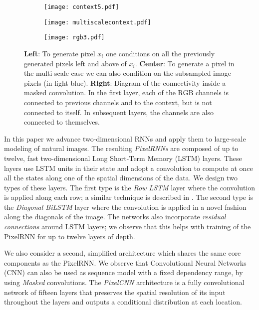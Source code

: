 \documentclass{article}
\begin{document}
\begin{figure}[h]

\hfill
\begin{subfigure}{.14\textwidth}
	\texttt{[image: context5.pdf]}
\end{subfigure}
\hfill
\begin{subfigure}{.14\textwidth}
	\texttt{[image: multiscalecontext.pdf]}
\end{subfigure}
\hfill
\begin{subfigure}{.16\textwidth}
	\texttt{[image: rgb3.pdf]}
\end{subfigure}
\hfill
\caption{\textbf{Left}: To generate pixel $x_i$ one conditions on all the previously generated pixels left and above of $x_i$. \textbf{Center}: To generate a pixel in the multi-scale case we can also condition on the subsampled image pixels (in light blue). \textbf{Right}: Diagram of the connectivity inside a masked convolution. In the first layer, each of the RGB channels is connected to previous channels and to the context, but is not connected to itself. In subsequent layers, the channels are also connected to themselves.}
\vspace{-0.2cm}
\label{depen}

\end{figure}

In this paper we advance two-dimensional RNNs and apply them to large-scale modeling of natural images.
The resulting \emph{PixelRNNs} are composed of up to twelve, fast two-dimensional Long Short-Term Memory (LSTM) layers. These layers use LSTM units in their state \cite{hochreiter1997long, graves2009offline}  and adopt a convolution to compute at once all the states along one of the spatial dimensions of the data. We design two types of these layers. The first type is the \emph{Row LSTM} layer where the convolution is applied along each row; a similar technique is described in \cite{NIPS2015_5642}. The second type is the \emph{Diagonal BiLSTM} layer where the convolution is applied in a novel fashion along the diagonals of the image. The networks also incorporate \emph{residual connections} \cite{DBLP:journals/corr/HeZRS15} around LSTM layers; we observe that this helps with training of the PixelRNN for up to twelve layers of depth. 

We also consider a second, simplified architecture which shares the same core components as the PixelRNN. 
We observe that Convolutional Neural Networks (CNN) can also be used as sequence model with a fixed dependency range, by using \emph{Masked} convolutions. The \emph{PixelCNN} architecture is a fully convolutional network of fifteen layers that preserves the spatial resolution of its input throughout the layers and outputs a conditional distribution at each location.
 
\end{document}
